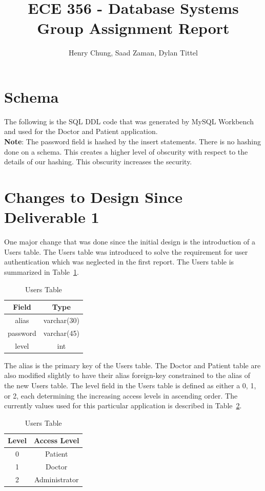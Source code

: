 \documentclass{article}
\begin{document}
\title{ECE 356 - Database Systems Group Assignment Report}
\author{Henry Chung, Saad Zaman, Dylan Tittel}

\maketitle

\tableofcontents
\newpage

\section{Schema}
The following is the SQL DDL code that was generated by MySQL Workbench and used for the Doctor and Patient application. \\

\textbf{Note}: The password field is hashed by the insert statements. There is no hashing done on a schema. This creates a higher level of obscurity with respect to the details of our hashing. This obscurity increases the security.



\section{Changes to Design Since Deliverable 1}
One major change that was done since the initial design is the introduction of a Users table. The Users table was introduced to solve the requirement for user authentication which was neglected in the first report. The Users table is summarized in Table~\ref{tab:usersTable}.
\begin{table}[H]
	\centering
	\caption{Users Table}
	\begin{tabular}{| c | c |}
		\hline
		Field    & Type \\
		\hline
		alias    & varchar(30) \\
		password & varchar(45) \\
		level    & int \\
		\hline
	\end{tabular}
	\label{tab:usersTable}
\end{table}
The alias is the primary key of the Users table. The Doctor and Patient table are also modified slightly to have their alias foreign-key constrained to the alias of the new Users table. The level field in the Users table is defined as either a 0, 1, or 2, each determining the increasing access levels in ascending order. The currently values used for this particular application is described in Table~\ref{tab:levelsTable}.
\begin{table}[H]
	\centering
	\caption{Users Table}
	\begin{tabular}{| c | c |}
		\hline
		Level & Access Level \\
		\hline
		0 & Patient \\
		1 & Doctor \\
		2 & Administrator \\
		\hline
	\end{tabular}
	\label{tab:levelsTable}
\end{table}
\end{document}
